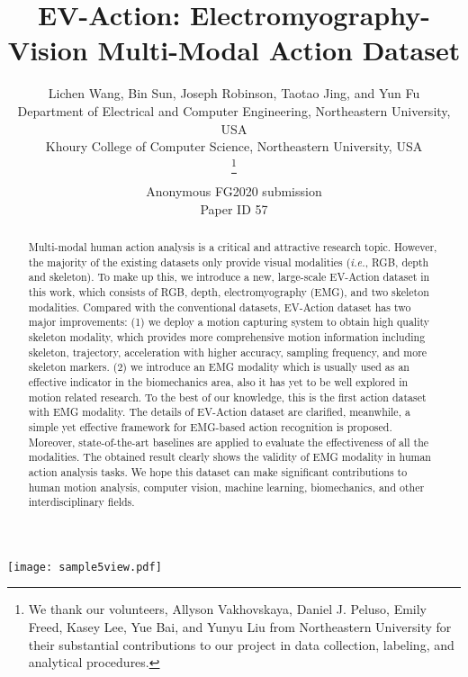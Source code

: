 \documentclass[a4paper, 10pt, conference]{ieeeconf}      \usepackage{FG2020}
\title{\LARGE \bf
EV-Action: Electromyography-Vision Multi-Modal Action Dataset}
\author{\parbox{16cm}{\centering
    {\large Lichen Wang, Bin Sun, Joseph Robinson, Taotao Jing, and Yun Fu}\\
    {\normalsize
     Department of Electrical and Computer Engineering, Northeastern University, USA\\
     Khoury College of Computer Science, Northeastern University, USA}}
    \thanks{We thank our volunteers, Allyson Vakhovskaya, Daniel J. Peluso, Emily Freed, Kasey Lee, Yue Bai, and Yunyu Liu from Northeastern University for their substantial contributions to our project in data collection, labeling, and analytical procedures.}}
\def\FGPaperID{57}
\newcommand*\ie{\textit{i.e.}}
\begin{document}
\ifFGfinal
\thispagestyle{empty}
\pagestyle{empty}
\else
\author{Anonymous FG2020 submission\\ Paper ID \FGPaperID \\}
\pagestyle{plain}
\fi
\maketitle

\begin{abstract}
Multi-modal human action analysis is a critical and attractive research topic. However, the majority of the existing datasets only provide visual modalities (\ie, RGB, depth and skeleton). To make up this, we introduce a new, large-scale EV-Action dataset in this work, which  consists of RGB, depth, electromyography (EMG), and two skeleton modalities. Compared with the conventional datasets, EV-Action dataset has two major improvements: (1) we deploy a motion capturing system to obtain high quality skeleton modality, which provides more comprehensive motion information including skeleton, trajectory, acceleration with higher accuracy, sampling frequency, and more skeleton markers. (2) we introduce an EMG modality which is usually used as an effective indicator in the biomechanics area, also it has yet to be well explored in motion related research. To the best of our knowledge, this is the first action dataset with EMG modality. The details of EV-Action dataset are clarified, meanwhile, a simple yet effective framework for EMG-based action recognition is proposed. Moreover, state-of-the-art baselines are applied to evaluate the effectiveness of all the modalities. The obtained result clearly shows the validity of EMG modality in human action analysis tasks. We hope this dataset can make significant contributions to human motion analysis, computer vision, machine learning, biomechanics, and other interdisciplinary fields.
\end{abstract}

\begin{figure*}
\centering
\texttt{[image: sample5view.pdf]}
\vspace{-1mm}
\caption{Visualization of sample frames in EV-Action dataset. Colored boxes show the correlations between visual modalities and EMG (\ie, \textit{Take Off} and \textit{Touch Down}). We can clearly observe that EMG responds early and last longer than visual modalities which provides unique view for action analysis. All modalities were well aligned and labeled.}\label{fig:samples}
\vspace{-4mm}
\end{figure*}
\end{document}
